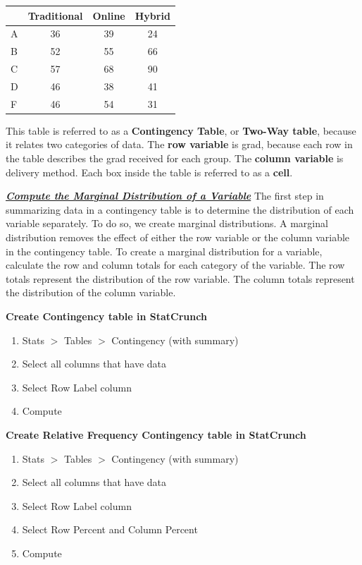 \documentclass{report}
\begin{document}
    \begin{center}
        \begin{center}
            \begin{tabular}{|l|c|c|c|}
            \hline
            	 & Traditional & Online & Hybrid\\
            	\hline
            A & 36 & 39 & 24   \\
            	\hline
            B & 52 & 55 & 66 \\
            \hline 
            C & 57 & 68 & 90 \\
            \hline
            D & 46 & 38 & 41 \\
            \hline
            F & 46 & 54 & 31 \\
            \hline
            \end{tabular}
        \end{center}
    \end{center}
    \bigbreak \noindent 
    This table is referred to as a \textbf{Contingency Table}, or \textbf{Two-Way table}, because it relates two categories of data. The \textbf{row variable} is grad, because each row in the table describes the grad received for each group. The \textbf{column variable} is delivery method. Each box inside the table is referred to as a \textbf{cell}.

    \bigbreak \noindent \bigbreak \noindent 
    \textbf{\textit{\underline{Compute the Marginal Distribution of a Variable}}}
    \bigbreak \noindent 
    The first step in summarizing data in a contingency table is to determine the distribution of each variable separately. To do so, we create marginal distributions.
    \bigbreak \noindent 
    A marginal distribution removes the effect of either the row variable or the column variable in the contingency table.
    \bigbreak \noindent 
    To create a marginal distribution for a variable, calculate the row and column totals for each category of the variable. The row totals represent the distribution of the row variable. The column totals represent the distribution of the column variable.

    \bigbreak \noindent 
    \textbf{Create Contingency table in StatCrunch}
    \begin{enumerate}
        \item Stats $> $ Tables $>  $ Contingency (with summary)
        \item Select all columns that have data
        \item Select Row Label column
        \item Compute
    \end{enumerate}
    \bigbreak \noindent 
        \textbf{Create Relative Frequency Contingency table in StatCrunch}
    \begin{enumerate}
        \item Stats $> $ Tables $>  $ Contingency (with summary)
        \item Select all columns that have data
        \item Select Row Label column
        \item Select Row Percent and Column Percent
        \item Compute
    \end{enumerate}
\end{document}
